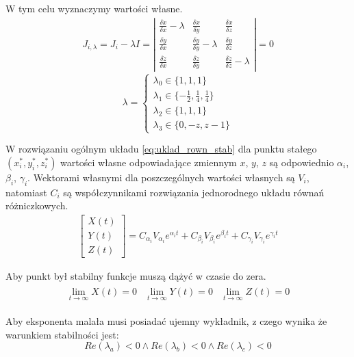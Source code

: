 W tym celu wyznaczymy wartości własne.
\begin{align}
J_{i,\lambda} = J_i - \lambda I = 
\left|
\begin{array}{ccc}
\frac{\delta \dot{x}}{\delta x}-\lambda & \frac{\delta \dot{x}}{\delta y} & \frac{\delta \dot{x}}{\delta z} \\
\frac{\delta \dot{y}}{\delta x} & \frac{\delta \dot{y}}{\delta y}-\lambda & \frac{\delta \dot{y}}{\delta z} \\
\frac{\delta \dot{z}}{\delta x} & \frac{\delta \dot{z}}{\delta y} & \frac{\delta \dot{z}}{\delta z}-\lambda
\end{array}
\right| = 0
\end{align}
\begin{equation*}
\lambda =
\left\{
\begin{array}{l}
\lambda_0 \in \{1,1,1\}\\
\lambda_1 \in \{-\frac{1}{2}, \frac{1}{4}, \frac{1}{4}\}\\
\lambda_2 \in \{1,1,1\}\\
\lambda_3 \in \{0,-z, z-1\}
\end{array}
\right.
\end{equation*}

W rozwiązaniu ogólnym układu \ref{eq:uklad_rown_stab} dla punktu stałego $(x^*_i, y^*_i, z^*_i)$ wartości własne odpowiadające zmiennym $x$, $y$, $z$ są odpowiednio $\alpha_i$, $\beta_i$, $\gamma_i$. Wektorami własnymi dla poszczególnych wartości własnych są $V_i$, natomiast $C_i$ są współczynnikami rozwiązania jednorodnego układu równań różniczkowych. 
\begin{align}\label{eq:rozw_ur}
\left[ \begin{array}{c}
X(t)\\
Y(t)\\
Z(t)
\end{array}
\right] = C_{\alpha_i} V_{\alpha_i} e^{\alpha_it} + C_{\beta_i} V_{\beta_i} e^{\beta_it} + C_{\gamma_i} V_{\gamma_i} e^{\gamma_it}
\end{align}

Aby punkt był stabilny funkcje muszą dążyć w czasie do zera.
\begin{align}
\begin{array}{ccc}
\displaystyle\lim_{t \to \infty} X(t)=0 & \displaystyle\lim_{t \to \infty} Y(t)=0 & \displaystyle\lim_{t \to \infty} Z(t)=0
\end{array}
\end{align}

Aby eksponenta malała musi posiadać ujemny wykładnik, z czego wynika że warunkiem stabilności jest:
\begin{equation}\label{eq:war_stab}
Re(\lambda_a)<0 \wedge Re(\lambda_b)<0 \wedge Re(\lambda_c)<0
\end{equation}

